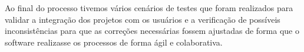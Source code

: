 

Ao final do processo tivemos vários cenários de testes que foram realizados para validar a integração dos projetos com os usuários e a verificação de possíveis inconsistências para que as correções necessárias fossem ajustadas de forma que o software realizasse os processos de forma ágil e colaborativa.

